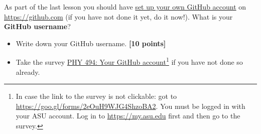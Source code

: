 \documentclass[letterpaper]{scrartcl}
\newcounter{TotalPoints}
\newcounter{TotalBonus}
\newcommand{\points}[1]{\textbf{[#1 points]}\stepcounter{TotalPoints}}
\begin{document}
As part of the last lesson you should have
\href{http://asu-compmethodsphysics-phy494.github.io/ASU-PHY494/page2/#set-up-your-own-github-repositories}{set
  up your own GitHub account} on \url{https://github.com} (if you have
not done it yet, do it now!). What is your \textbf{GitHub username}?
\begin{itemize}
\item Write down your GitHub username. \points{10}
\item Take the survey
  \href{https://goo.gl/forms/2eOuH9WJG4ShzoBA2}{PHY
    494: Your GitHub account}\footnote{In case the link to the survey
    is not clickable: got to
    \url{https://goo.gl/forms/2eOuH9WJG4ShzoBA2}. You must be logged
    in with your ASU account. Log in to \url{https://my.asu.edu} first
    and then go to the survey.} if you have not done so already.
\end{itemize}




\end{document}
